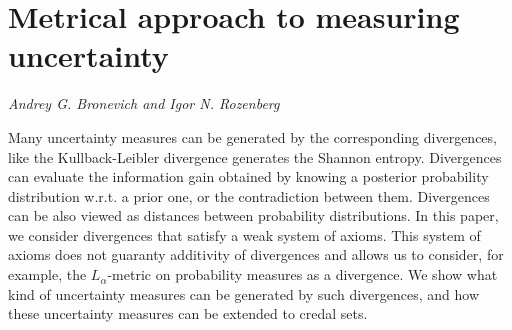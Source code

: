 \documentclass[../booklet.tex]{subfiles}
\begin{document}
\section[Metrical approach to measuring uncertainty. {\it Andrey G. Bronevich and Igor N. Rozenberg}]{Metrical approach to measuring uncertainty}
 

\begin{center}
  {\it Andrey G. Bronevich and Igor N. Rozenberg}
\end{center}

\vskip 0.8cm


Many uncertainty measures can be generated by the corresponding divergences, like the Kullback-Leibler divergence generates the Shannon entropy. Divergences can evaluate the information gain obtained by knowing a posterior probability distribution w.r.t. a prior one, or the contradiction between them. Divergences can be also viewed as distances between probability distributions.  
In this paper, we consider divergences that satisfy a weak system of axioms. This system of axioms does not guaranty additivity of divergences and allows us to consider, for example, the ${L_\alpha }$-metric on probability measures as a divergence. We show what kind of uncertainty measures can be generated by such divergences, and how these uncertainty measures can be extended to credal sets.

\end{document}
